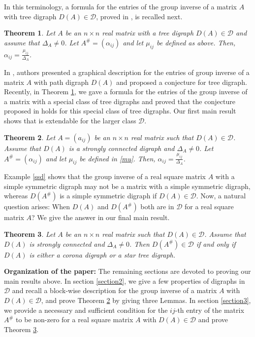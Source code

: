 \documentclass[notitlepage,12pt,reqno]{amsart}
\newtheorem{thm}{Theorem}[section]
\numberwithin{equation}{section}
\begin{document}
In this terminology, a formula for the entries of the group inverse of a matrix $A$ with tree digraph $D(A)\in \mathcal{D}$, proved in \cite{nandi}, is recalled next.
\begin{thm}\cite[Theorem 1.4]{nandi}\label{treeresult}
Let $A$ be an $n\times n$ real matrix with a tree digraph $D(A)\in \mathcal{D}$ and assume that $\Delta _A \neq 0$. Let $A^{\#}=(\alpha _{ij})$ and let $\mu _{ij}$ be defined as above. Then, $\alpha _{ij}=\frac{\mu _{ij}}{\Delta _A}$.
\end{thm}
In \cite{cov}, authors presented a graphical description for the entries of group inverse of a matrix $A$ with path digraph $D(A)$ and proposed a conjecture for tree digraph. Recently, in Theorem \ref{treeresult}, we gave a formula for the entries of the group inverse of a matrix with a special class of tree digraphs and proved that the conjecture proposed in \cite{cov} holds for this special class of tree digraphs. Our first main result shows that \cite[Theorem 1.4]{nandi} is extendable for the larger class $\mathcal{D}$.
\begin{thm}\label{finalresult}
Let $A=(a_{ij})$ be an $n\times n$ real matrix such that $D(A)\in \mathcal{D}$. Assume that $D(A)$ is a strongly connected digraph and $\Delta _A \neq 0$. Let $A^{\#}=(\alpha _{ij})$ and let $\mu _{ij}$ be defined in \ref{mu}. Then, $\alpha _{ij}=\frac{\mu _{ij}}{\Delta _A}$.
\end{thm}
Example \ref{ssd} shows that the group inverse of a real square matrix $A$ with a simple symmetric digraph may not be a matrix with a simple symmetric digraph, whereas $D(A^{\#})$ is a simple symmetric digraph if $D(A)\in \mathcal{D}$. Now, a natural question arises: When $D(A)$ and $D(A^{\#})$ both are in $\mathcal{D}$ for a real square matrix $A$? We give the answer in our final main result.
\begin{thm}\label{maintheorem}
Let $A$ be an $n\times n$ real matrix such that $D(A)\in \mathcal{D}$. Assume that $D(A)$ is strongly connected and $\Delta _A\neq 0$. Then $D(A^{\#})\in \mathcal{D}$ if and only if $D(A)$ is either a corona digraph or a star tree digraph.
\end{thm}
\noindent\textbf{Organization of the paper:} The remaining sections are devoted to proving our main results above. In section \ref{section2}, we give a few properties of digraphs in $\mathcal{D}$ and recall a block-wise description for the group inverse of a matrix $A$ with $D(A)\in \mathcal{D}$, and prove Theorem \ref{finalresult} by giving three Lemmas. In section \ref{section3}, we provide a necessary and sufficient condition for the $ij$-th entry of the matrix $A^{\#}$ to be non-zero for a real square matrix $A$ with $D(A)\in \mathcal{D}$ and prove Theorem \ref{maintheorem}.
\end{document}
